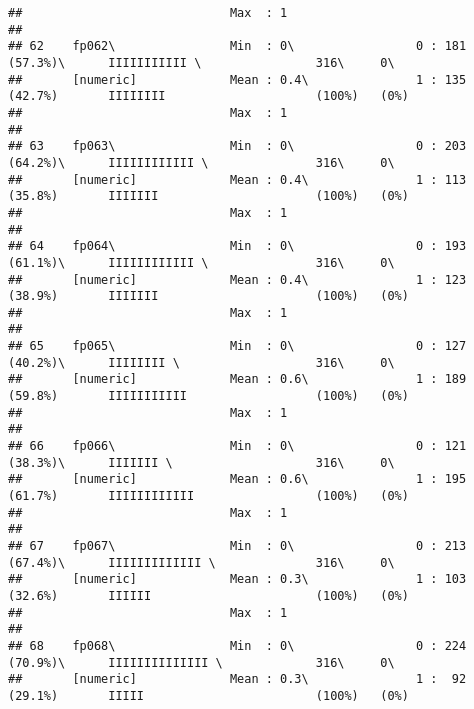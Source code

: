 \documentclass[]{article}
\begin{document}
\begin{verbatim}
##                             Max  : 1                                                                                       
## 
## 62    fp062\                Min  : 0\                 0 : 181 (57.3%)\      IIIIIIIIIII \                316\     0\       
##       [numeric]             Mean : 0.4\               1 : 135 (42.7%)       IIIIIIII                     (100%)   (0%)     
##                             Max  : 1                                                                                       
## 
## 63    fp063\                Min  : 0\                 0 : 203 (64.2%)\      IIIIIIIIIIII \               316\     0\       
##       [numeric]             Mean : 0.4\               1 : 113 (35.8%)       IIIIIII                      (100%)   (0%)     
##                             Max  : 1                                                                                       
## 
## 64    fp064\                Min  : 0\                 0 : 193 (61.1%)\      IIIIIIIIIIII \               316\     0\       
##       [numeric]             Mean : 0.4\               1 : 123 (38.9%)       IIIIIII                      (100%)   (0%)     
##                             Max  : 1                                                                                       
## 
## 65    fp065\                Min  : 0\                 0 : 127 (40.2%)\      IIIIIIII \                   316\     0\       
##       [numeric]             Mean : 0.6\               1 : 189 (59.8%)       IIIIIIIIIII                  (100%)   (0%)     
##                             Max  : 1                                                                                       
## 
## 66    fp066\                Min  : 0\                 0 : 121 (38.3%)\      IIIIIII \                    316\     0\       
##       [numeric]             Mean : 0.6\               1 : 195 (61.7%)       IIIIIIIIIIII                 (100%)   (0%)     
##                             Max  : 1                                                                                       
## 
## 67    fp067\                Min  : 0\                 0 : 213 (67.4%)\      IIIIIIIIIIIII \              316\     0\       
##       [numeric]             Mean : 0.3\               1 : 103 (32.6%)       IIIIII                       (100%)   (0%)     
##                             Max  : 1                                                                                       
## 
## 68    fp068\                Min  : 0\                 0 : 224 (70.9%)\      IIIIIIIIIIIIII \             316\     0\       
##       [numeric]             Mean : 0.3\               1 :  92 (29.1%)       IIIII                        (100%)   (0%)     

\end{verbatim}
\end{document}
